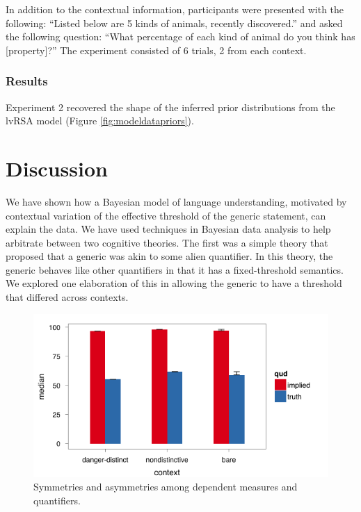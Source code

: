 \documentclass[10pt,letterpaper]{article}
\begin{document}
In addition to the contextual information, participants were presented with the following: ``Listed below are 5 kinds of animals, recently discovered.'' and asked the following question: ``What percentage of each kind of animal do you think has [property]?'' The experiment consisted of 6 trials, 2 from each context. 

\subsubsection{Results}

Experiment 2 recovered the shape of the inferred prior distributions from the lvRSA model (Figure \ref{fig:modeldatapriors}).


\section{Discussion}

We have shown how a Bayesian model of language understanding, motivated by contextual variation of the effective threshold of the generic statement, can explain the data. We have used techniques in Bayesian data analysis to help arbitrate between two cognitive theories. The first was a simple theory that proposed that a generic was akin to some alien quantifier. In this theory, the generic behaves like other quantifiers in that it has a fixed-threshold semantics. We explored one elaboration of this in allowing the generic to have a threshold that differed across contexts. 

\begin{figure}
\centering
    \includegraphics[width=\columnwidth]{asymmetry_byContext_condTwice}
    \caption{Symmetries and asymmetries among dependent measures and quantifiers.}
  \label{fig:asymmetry}
\end{figure}
\end{document}

